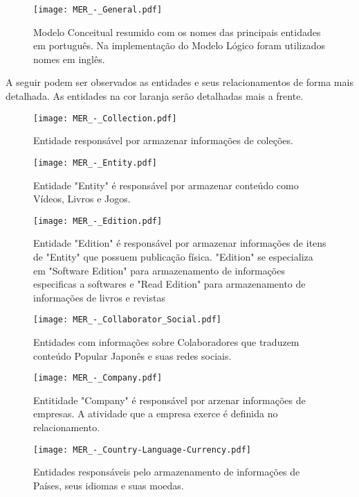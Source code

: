 \documentclass[12pt]{article}
\begin{document}
\begin{figure}[H]
\centering
\texttt{[image: MER\_-\_General.pdf]}
\caption{Modelo Conceitual resumido com os nomes das principais entidades em português. Na implementação do Modelo Lógico foram utilizados nomes em inglês.} \label{hash}
\end{figure}


A seguir podem ser observados as entidades e seus relacionamentos de forma mais detalhada. As entidades na cor laranja serão detalhadas mais a frente.

\begin{figure}[H]
\centering
\texttt{[image: MER\_-\_Collection.pdf]}
\caption{Entidade responsável por armazenar informações de coleções.} \label{collection}
\end{figure}


\begin{figure}[H]
\centering
\texttt{[image: MER\_-\_Entity.pdf]}
\caption{Entidade "Entity" é responsável por armazenar conteúdo como Vídeos, Livros e Jogos.} \label{entity}
\end{figure}

\begin{figure}[H]
\centering
\texttt{[image: MER\_-\_Edition.pdf]}
\caption{Entidade "Edition" é responsável por armazenar informações de itens de "Entity" que possuem publicação física. "Edition" se especializa em "Software Edition" para armazenamento de informações especificas a softwares e "Read Edition" para armazenamento de informações de livros e revistas} \label{edition}
\end{figure}

\begin{figure}[H]
\centering
\texttt{[image: MER\_-\_Collaborator\_Social.pdf]}
\caption{Entidades com informações sobre Colaboradores que traduzem conteúdo Popular Japonês e suas redes sociais.} \label{collaborator}
\end{figure}

\begin{figure}[H]
\centering
\texttt{[image: MER\_-\_Company.pdf]}
\caption{Entitidade "Company" é responsável por arzenar informações de empresas. A atividade que a empresa exerce é definida no relacionamento.} \label{company}
\end{figure}

\begin{figure}[H]
\centering
\texttt{[image: MER\_-\_Country-Language-Currency.pdf]}
\caption{Entidades responsáveis pelo armazenamento de informações de Países, seus idiomas e suas moedas.} \label{hash}
\end{figure}
\end{document}
